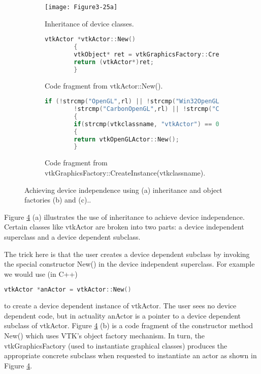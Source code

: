 \begin{figure}[!htb]
	\begin{subfigure}[h]{0.96\linewidth}
		\texttt{[image: Figure3-25a]}
		\caption{Inheritance of device classes.}
		\label{fig:Figure3-25a}
	\end{subfigure}
	\hfill
	\begin{subfigure}[h]{0.96\linewidth}
		\caption*{}
	\end{subfigure}
	\hfill
	\begin{subfigure}[h]{0.96\linewidth}
		\begin{lstlisting}[language=C++, caption={}]
		vtkActor *vtkActor::New()
		{
		vtkObject* ret = vtkGraphicsFactory::CreateInstance("vtkActor");
		return (vtkActor*)ret;
		}
		\end{lstlisting}
		\caption{Code fragment from vtkActor::New().}
		\label{fig:Figure3-25b}
	\end{subfigure}
	\hfill
	\begin{subfigure}[h]{0.96\linewidth}
		\caption*{}
	\end{subfigure}
	\hfill
	\begin{subfigure}[h]{0.96\linewidth}
		\begin{lstlisting}[language=C++, caption={}]
		if (!strcmp("OpenGL",rl) || !strcmp("Win32OpenGL",rl) ||
		!strcmp("CarbonOpenGL",rl) || !strcmp("CocoaOpenGL",rl))
		{
		if(strcmp(vtkclassname, "vtkActor") == 0)
		{
		return vtkOpenGLActor::New();
		}
		\end{lstlisting}
		\caption{Code fragment from vtkGraphicsFactory::CreateInstance(vtkclassname).}
		\label{fig:Figure3-25cc}
	\end{subfigure}
	\caption{Achieving device independence using (a) inheritance and object factories (b) and (c)..}\label{fig:Figure3-25}
\end{figure}

Figure \ref{fig:Figure3-25} (a) illustrates the use of inheritance to achieve device independence. Certain classes like vtkActor are broken into two parts: a device independent superclass and a device dependent subclass.

\begin{samepage}
The trick here is that the user creates a device dependent
subclass by invoking the special constructor New() in the device independent superclass. For example we would use (in C++)
\begin{lstlisting}[language=C++]
vtkActor *anActor = vtkActor::New()
\end{lstlisting}
\noindent to create a device dependent instance of vtkActor. The user sees no device dependent code, but in actuality anActor is a pointer to a device dependent subclass of vtkActor. Figure \ref{fig:Figure3-25} (b) is a code fragment of the constructor method New() which uses VTK's object factory mechanism. In turn, the vtkGraphicsFactory (used to instantiate graphical classes) produces the appropriate concrete subclass when requested to instantiate an actor as shown in Figure \ref{fig:Figure3-25}.
\end{samepage}

